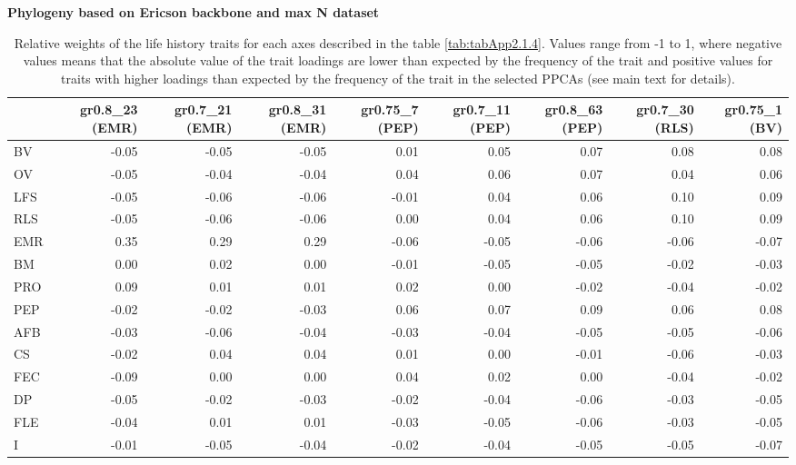 \clearpage%
\begin{landscape}%
\begin{table}
\center
\caption[LHT relative importance of the alternative axes]{
Relative weights of the life history traits for each axes described in the
table \ref{tab:tabApp2.1.4}. Values range from -1 to 1, where negative values
means that the absolute value of the trait loadings are lower than expected by
the frequency of the trait and positive values for traits with higher loadings
than expected by the frequency of the trait in the selected PPCAs (see main
text for details).
}
\label{tab:tabApp2.1.6}
\begin{footnotesize}

\textbf{Phylogeny based on Ericson backbone and max N dataset}

\begin{tabular}{@{}l|rrrrrrrr@{}}
\toprule
  & gr0.8\_23 (EMR) & gr0.7\_21 (EMR) & gr0.8\_31 (EMR) & gr0.75\_7 (PEP) & gr0.7\_11 (PEP) & gr0.8\_63 (PEP) & gr0.7\_30 (RLS) & gr0.75\_1 (BV)\\
\midrule
BV & -0.05 & -0.05 & -0.05 & 0.01 & 0.05 & 0.07 & 0.08 & 0.08\\
OV & -0.05 & -0.04 & -0.04 & 0.04 & 0.06 & 0.07 & 0.04 & 0.06\\
LFS & -0.05 & -0.06 & -0.06 & -0.01 & 0.04 & 0.06 & 0.10 & 0.09\\
RLS & -0.05 & -0.06 & -0.06 & 0.00 & 0.04 & 0.06 & 0.10 & 0.09\\
EMR & 0.35 & 0.29 & 0.29 & -0.06 & -0.05 & -0.06 & -0.06 & -0.07\\
BM & 0.00 & 0.02 & 0.00 & -0.01 & -0.05 & -0.05 & -0.02 & -0.03\\
PRO & 0.09 & 0.01 & 0.01 & 0.02 & 0.00 & -0.02 & -0.04 & -0.02\\
PEP & -0.02 & -0.02 & -0.03 & 0.06 & 0.07 & 0.09 & 0.06 & 0.08\\
AFB & -0.03 & -0.06 & -0.04 & -0.03 & -0.04 & -0.05 & -0.05 & -0.06\\
CS & -0.02 & 0.04 & 0.04 & 0.01 & 0.00 & -0.01 & -0.06 & -0.03\\
FEC & -0.09 & 0.00 & 0.00 & 0.04 & 0.02 & 0.00 & -0.04 & -0.02\\
DP & -0.05 & -0.02 & -0.03 & -0.02 & -0.04 & -0.06 & -0.03 & -0.05\\
FLE & -0.04 & 0.01 & 0.01 & -0.03 & -0.05 & -0.06 & -0.03 & -0.05\\
I & -0.01 & -0.05 & -0.04 & -0.02 & -0.04 & -0.05 & -0.05 & -0.07\\
\bottomrule
\end{tabular}


\end{footnotesize}
\end{table}
\end{landscape}
